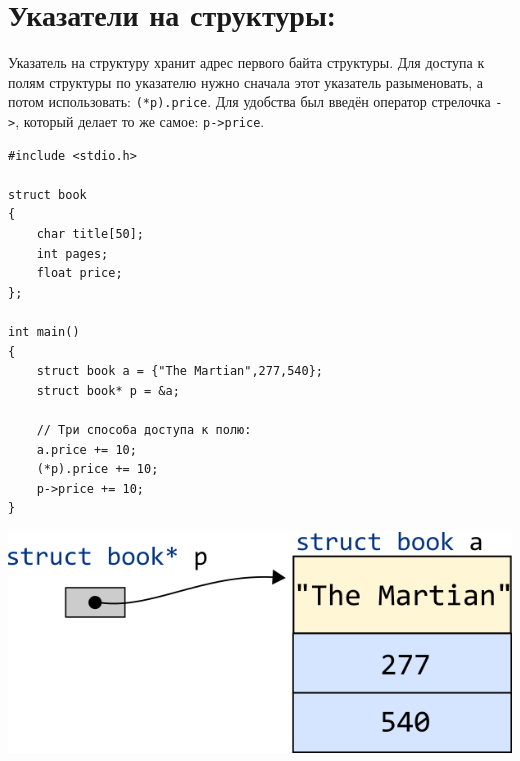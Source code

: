 \documentclass{article}
\begin{document}
\section*{Указатели на структуры:}
Указатель на структуру хранит адрес первого байта структуры. Для доступа к полям структуры по указателю нужно сначала этот указатель разыменовать, а потом использовать: \texttt{(*p).price}. Для удобства был введён оператор стрелочка \texttt{->}, который делает то же самое: \texttt{p->price}.
\begin{multicols}{2}
\begin{lstlisting}
#include <stdio.h>

struct book 
{
    char title[50];
    int pages;
    float price;
};

int main() 
{
    struct book a = {"The Martian",277,540};
    struct book* p = &a;
    
    // Три способа доступа к полю:
    a.price += 10;
    (*p).price += 10;
    p->price += 10;
}
\end{lstlisting}

\vfill\null
\columnbreak

\vspace*{3\baselineskip}
\begin{center}
\includegraphics[scale=0.5]{../images/structpointer2.png}
\end{center}
\end{multicols}
\end{document}
